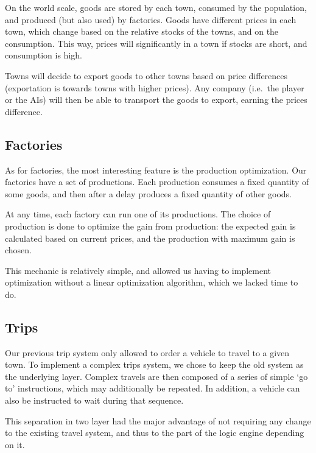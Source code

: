 \documentclass{article}
\begin{document}
On the world scale, goods are stored by each town, consumed by the population, and produced (but also used) by factories.
Goods have different prices in each town, which change based on the relative stocks of the towns, and on the consumption.
This way, prices will significantly in a town if stocks are short, and consumption is high.

Towns will decide to export goods to other towns based on price differences (exportation is towards towns with higher prices).
Any company (i.e.\ the player or the AIs) will then be able to transport the goods to export, earning the prices difference.

\subsection{Factories}
As for factories, the most interesting feature is the production optimization.
Our factories have a set of productions.
Each production consumes a fixed quantity of some goods, and then after a delay produces a fixed quantity of other goods.

At any time, each factory can run one of its productions.
The choice of production is done to optimize the gain from production: the expected gain is calculated based on current prices,
and the production with maximum gain is chosen.

This mechanic is relatively simple, and allowed us having to implement optimization without a linear optimization algorithm,
which we lacked time to do.

\subsection{Trips}
Our previous trip system only allowed to order a vehicle to travel to a given town.
To implement a complex trips system, we chose to keep the old system as the underlying layer.
Complex travels are then composed of a series of simple `go to' instructions, which may additionally be repeated.
In addition, a vehicle can also be instructed to wait during that sequence.

This separation in two layer had the major advantage of not requiring any change to the existing travel system,
and thus to the part of the logic engine depending on it.
\end{document}
